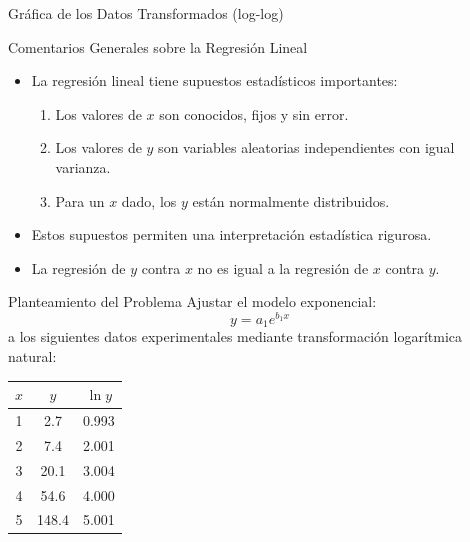 \documentclass[main.tex]{subfiles}
\begin{document}
\begin{frame}{Gráfica de los Datos Transformados (log-log)}
  \begin{center}
  \end{center}
\end{frame}

\begin{frame}{Comentarios Generales sobre la Regresión Lineal}
  \begin{itemize}
    \item La regresión lineal tiene supuestos estadísticos importantes:
    \begin{enumerate}
      \item Los valores de \(x\) son conocidos, fijos y sin error.
      \item Los valores de \(y\) son variables aleatorias independientes con igual varianza.
      \item Para un \(x\) dado, los \(y\) están normalmente distribuidos.
    \end{enumerate}
    \item Estos supuestos permiten una interpretación estadística rigurosa.
    \item La regresión de \(y\) contra \(x\) no es igual a la regresión de \(x\) contra \(y\).
  \end{itemize}
\end{frame}

\begin{frame}{Planteamiento del Problema}
  \small
  Ajustar el modelo exponencial:
  \[
    y = a_1 e^{b_1 x}
  \]
  a los siguientes datos experimentales mediante transformación logarítmica natural:

  \begin{center}
    \begin{tabular}{ccc}
    \hline
    \(x\) & \(y\) & \(\ln y\) \\
    \hline
    1 & 2.7 & 0.993 \\
    2 & 7.4 & 2.001 \\
    3 & 20.1 & 3.004 \\
    4 & 54.6 & 4.000 \\
    5 & 148.4 & 5.001 \\
    \hline
    \end{tabular}
  \end{center}
\end{frame}
\end{document}

